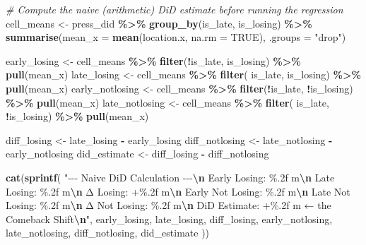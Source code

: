 \documentclass[
]{article}
\newenvironment{Shaded}{\begin{snugshade}}{\end{snugshade}}
\newcommand{\AttributeTok}[1]{\textcolor[rgb]{0.13,0.29,0.53}{#1}}
\newcommand{\CommentTok}[1]{\textcolor[rgb]{0.56,0.35,0.01}{\textit{#1}}}
\newcommand{\ConstantTok}[1]{\textcolor[rgb]{0.56,0.35,0.01}{#1}}
\newcommand{\FunctionTok}[1]{\textcolor[rgb]{0.13,0.29,0.53}{\textbf{#1}}}
\newcommand{\NormalTok}[1]{#1}
\newcommand{\OtherTok}[1]{\textcolor[rgb]{0.56,0.35,0.01}{#1}}
\newcommand{\SpecialCharTok}[1]{\textcolor[rgb]{0.81,0.36,0.00}{\textbf{#1}}}
\newcommand{\StringTok}[1]{\textcolor[rgb]{0.31,0.60,0.02}{#1}}
\begin{document}
\begin{Shaded}
\begin{Highlighting}[]
\CommentTok{\# Compute the naive (arithmetic) DiD estimate before running the regression}
\NormalTok{cell\_means }\OtherTok{\textless{}{-}}\NormalTok{ press\_did }\SpecialCharTok{\%\textgreater{}\%}
  \FunctionTok{group\_by}\NormalTok{(is\_late, is\_losing) }\SpecialCharTok{\%\textgreater{}\%}
  \FunctionTok{summarise}\NormalTok{(}\AttributeTok{mean\_x =} \FunctionTok{mean}\NormalTok{(location.x, }\AttributeTok{na.rm =} \ConstantTok{TRUE}\NormalTok{), }\AttributeTok{.groups =} \StringTok{"drop"}\NormalTok{)}

\NormalTok{early\_losing    }\OtherTok{\textless{}{-}}\NormalTok{ cell\_means }\SpecialCharTok{\%\textgreater{}\%} \FunctionTok{filter}\NormalTok{(}\SpecialCharTok{!}\NormalTok{is\_late,  is\_losing) }\SpecialCharTok{\%\textgreater{}\%} \FunctionTok{pull}\NormalTok{(mean\_x)}
\NormalTok{late\_losing     }\OtherTok{\textless{}{-}}\NormalTok{ cell\_means }\SpecialCharTok{\%\textgreater{}\%} \FunctionTok{filter}\NormalTok{( is\_late,  is\_losing) }\SpecialCharTok{\%\textgreater{}\%} \FunctionTok{pull}\NormalTok{(mean\_x)}
\NormalTok{early\_notlosing }\OtherTok{\textless{}{-}}\NormalTok{ cell\_means }\SpecialCharTok{\%\textgreater{}\%} \FunctionTok{filter}\NormalTok{(}\SpecialCharTok{!}\NormalTok{is\_late, }\SpecialCharTok{!}\NormalTok{is\_losing) }\SpecialCharTok{\%\textgreater{}\%} \FunctionTok{pull}\NormalTok{(mean\_x)}
\NormalTok{late\_notlosing  }\OtherTok{\textless{}{-}}\NormalTok{ cell\_means }\SpecialCharTok{\%\textgreater{}\%} \FunctionTok{filter}\NormalTok{( is\_late, }\SpecialCharTok{!}\NormalTok{is\_losing) }\SpecialCharTok{\%\textgreater{}\%} \FunctionTok{pull}\NormalTok{(mean\_x)}

\NormalTok{diff\_losing    }\OtherTok{\textless{}{-}}\NormalTok{ late\_losing    }\SpecialCharTok{{-}}\NormalTok{ early\_losing}
\NormalTok{diff\_notlosing }\OtherTok{\textless{}{-}}\NormalTok{ late\_notlosing }\SpecialCharTok{{-}}\NormalTok{ early\_notlosing}
\NormalTok{did\_estimate   }\OtherTok{\textless{}{-}}\NormalTok{ diff\_losing    }\SpecialCharTok{{-}}\NormalTok{ diff\_notlosing}

\FunctionTok{cat}\NormalTok{(}\FunctionTok{sprintf}\NormalTok{(}
  \StringTok{"{-}{-}{-} Naive DiD Calculation {-}{-}{-}}\SpecialCharTok{\textbackslash{}n}
\StringTok{  Early Losing:      \%.2f m}\SpecialCharTok{\textbackslash{}n}\StringTok{  Late Losing:       \%.2f m}\SpecialCharTok{\textbackslash{}n}\StringTok{  Δ Losing:         +\%.2f m}\SpecialCharTok{\textbackslash{}n}
\StringTok{  Early Not Losing:  \%.2f m}\SpecialCharTok{\textbackslash{}n}\StringTok{  Late Not Losing:   \%.2f m}\SpecialCharTok{\textbackslash{}n}\StringTok{  Δ Not Losing:      \%.2f m}\SpecialCharTok{\textbackslash{}n}
\StringTok{  DiD Estimate:      +\%.2f m  ← the Comeback Shift}\SpecialCharTok{\textbackslash{}n}\StringTok{"}\NormalTok{,}
\NormalTok{  early\_losing, late\_losing, diff\_losing,}
\NormalTok{  early\_notlosing, late\_notlosing, diff\_notlosing,}
\NormalTok{  did\_estimate}
\NormalTok{))}
\end{Highlighting}
\end{Shaded}
\end{document}
